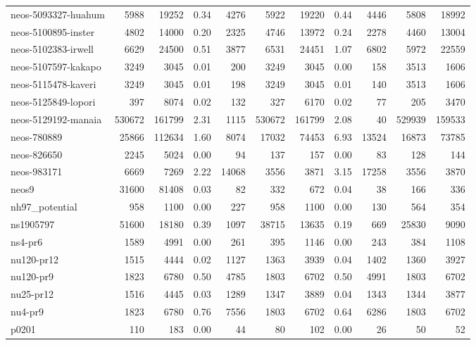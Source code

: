 \documentclass[pdflatex,sn-mathphys-num]{sn-jnl}%
\theoremstyle{thmstyleone}%
\theoremstyle{thmstylethree}%
\theoremstyle{thmstyletwo}%
\begin{document}
\begin{appendices}
{\begin{longtable}{l|r|r|r|r|r|r|r|r|r|r}
neos-5093327-huahum            & 5988 & 19252 & 0.34 & 4276 & 5922 & 19220 & 0.44 & 4446 & 5808 & 18992\\
neos-5100895-inster            & 4802 & 14000 & 0.20 & 2325 & 4746 & 13972 & 0.24 & 2278 & 4460 & 13004\\
neos-5102383-irwell            & 6629 & 24500 & 0.51 & 3877 & 6531 & 24451 & 1.07 & 6802 & 5972 & 22559\\
neos-5107597-kakapo            & 3249 & 3045 & 0.01 & 200 & 3249 & 3045 & 0.00 & 158 & 3513 & 1606\\
neos-5115478-kaveri            & 3249 & 3045 & 0.01 & 198 & 3249 & 3045 & 0.01 & 140 & 3513 & 1606\\
neos-5125849-lopori            & 397 & 8074 & 0.02 & 132 & 327 & 6170 & 0.02 & 77 & 205 & 3470\\
neos-5129192-manaia            & 530672 & 161799 & 2.31 & 1115 & 530672 & 161799 & 2.08 & 40 & 529939 & 159533\\
neos-780889                    & 25866 & 112634 & 1.60 & 8074 & 17032 & 74453 & 6.93 & 13524 & 16873 & 73785\\
neos-826650                    & 2245 & 5024 & 0.00 & 94 & 137 & 157 & 0.00 & 83 & 128 & 144\\
neos-983171                    & 6669 & 7269 & 2.22 & 14068 & 3556 & 3871 & 3.15 & 17258 & 3556 & 3870\\
neos9                          & 31600 & 81408 & 0.03 & 82 & 332 & 672 & 0.04 & 38 & 166 & 336\\
nh97\_potential                 & 958 & 1100 & 0.00 & 227 & 958 & 1100 & 0.00 & 130 & 564 & 354\\
ns1905797                      & 51600 & 18180 & 0.39 & 1097 & 38715 & 13635 & 0.19 & 669 & 25830 & 9090\\
ns4-pr6                        & 1589 & 4991 & 0.00 & 261 & 395 & 1146 & 0.00 & 243 & 384 & 1108\\
nu120-pr12                     & 1515 & 4444 & 0.02 & 1127 & 1363 & 3939 & 0.04 & 1402 & 1360 & 3927\\
nu120-pr9                      & 1823 & 6780 & 0.50 & 4785 & 1803 & 6702 & 0.50 & 4991 & 1803 & 6702\\
nu25-pr12                      & 1516 & 4445 & 0.03 & 1289 & 1347 & 3889 & 0.04 & 1343 & 1344 & 3877\\
nu4-pr9                        & 1823 & 6780 & 0.76 & 7556 & 1803 & 6702 & 0.64 & 6286 & 1803 & 6702\\
p0201                          & 110 & 183 & 0.00 & 44 & 80 & 102 & 0.00 & 26 & 50 & 52\\

\end{longtable}}
\end{appendices}
\end{document}
